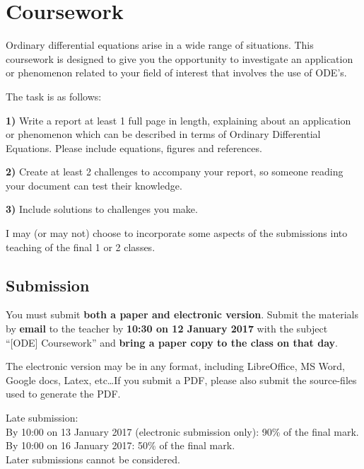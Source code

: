 \newpage
\section{Coursework}
Ordinary differential equations arise in a wide range of situations. This coursework is designed to give you the opportunity to investigate an application or phenomenon related to your field of interest that involves the use of ODE's.

The task is as follows:

\textbf{1)} Write a report at least 1 full page in length, explaining about an application or phenomenon which can be described in terms of Ordinary Differential Equations. Please include equations, figures and references.

\textbf{2)} Create at least 2 challenges to accompany your report, so someone reading your document can test their knowledge.

\textbf{3)} Include solutions to challenges you make.

I may (or may not) choose to incorporate some aspects of the submissions into teaching of the final 1 or 2 classes.

\subsection{Submission}
You must submit \textbf{both a paper and electronic version}. Submit the materials by \textbf{email} to the teacher by \textbf{10:30 on 12 January 2017} with the subject ``[ODE] Coursework'' and \textbf{bring a paper copy to the class on that day}.

The electronic version may be in any format, including LibreOffice, MS Word, Google docs, Latex, etc\ldots If you submit a PDF, please also submit the source-files used to generate the PDF.

Late submission:\\
By 10:00 on 13 January 2017 (electronic submission only): 90\% of the final mark.\\
By 10:00 on 16 January 2017: 50\% of the final mark.\\
Later submissions cannot be considered.

